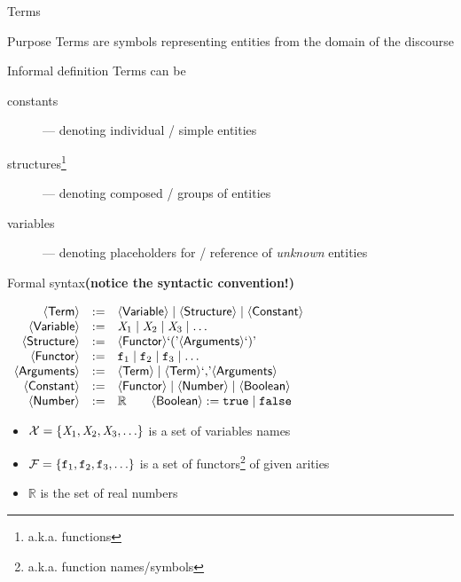 \documentclass[presentation]{beamer}\mode<presentation>{\usetheme{AMSBolognaFC}}
\begin{document}
\begin{frame}[allowframebreaks]{Terms}
    \begin{block}{Purpose}\centering
        Terms are symbols representing entities from the \alert{domain of the discourse}
    \end{block}
    \begin{block}{Informal definition}
        Terms can be
        \begin{description}
            \item[constants] --- denoting \alert{individual} / simple entities
            \item[structures\footnote{a.k.a. functions}] --- denoting \alert{composed} / groups of entities
            \item[variables] --- denoting \alert{placeholders} for / reference of \emph{unknown} entities
        \end{description}
    \end{block}
    \begin{alertblock}{Formal syntax\hfill\textbf{\footnotesize(notice the syntactic convention!)}}\label{slide:terms}
        \begin{center}
            $\begin{array}{rcl}
                \mathsf{\left\langle Term\right\rangle} & := & \mathsf{\left\langle Variable\right\rangle} \mid \mathsf{\left\langle Structure\right\rangle} \mid \mathsf{\left\langle Constant\right\rangle}
                \\
                \mathsf{\left\langle Variable\right\rangle} & := & \mathit{X}_1 \mid \mathit{X}_2 \mid \mathit{X}_3 \mid \ldots
                \\
                \mathsf{\left\langle Structure\right\rangle} & := & \mathsf{\left\langle Functor\right\rangle} \text{`}\mathit{(}\text{'} \mathsf{\left\langle Arguments\right\rangle} \text{`}\mathit{)}\text{'}
                \\
                \mathsf{\left\langle Functor\right\rangle} & := & \mathtt{f}_1 \mid \mathtt{f}_2 \mid \mathtt{f}_3 \mid \ldots
                \\
                \mathsf{\left\langle Arguments\right\rangle} & := & \mathsf{\left\langle Term\right\rangle} \mid \mathsf{\left\langle Term\right\rangle} \text{`}\mathit{,}\text{'} \mathsf{\left\langle Arguments\right\rangle}
                \\
                \mathsf{\left\langle Constant\right\rangle} & := & \mathsf{\left\langle Functor\right\rangle} \mid \mathsf{\left\langle Number\right\rangle}\mid \mathsf{\left\langle Boolean\right\rangle}
                \\
                \mathsf{\left\langle Number\right\rangle} & := & \mathbb{R} \qquad \mathsf{\left\langle Boolean\right\rangle} :=  \mathtt{true} \mid \mathtt{false}
            \end{array}$
        \end{center}
        \begin{itemize}
            \item $\mathcal{X} = \{ \mathit{X}_1, \mathit{X}_2, \mathit{X}_3, \ldots \}$ is a set of \alert{variables names}
            \item $\mathcal{F} = \{ \mathtt{f}_1, \mathtt{f}_2, \mathtt{f}_3, \ldots \}$ is a set of \alert{functors}\footnote{a.k.a. function names/symbols} of given \alert{arities}
            \item $\mathbb{R}$ is the set of real numbers
        \end{itemize}
    \end{alertblock}


\end{frame}
\end{document}
